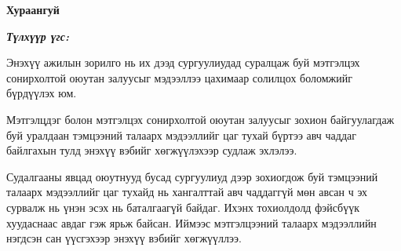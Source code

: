

\begin{center}
{\scshape\Large \univname\par} %
{\scshape\large \facname\par}\vspace{0.5cm} %
{\huge\textbf{{Хураангуй}} \par}
\bigskip
{\Large{\ttitle} \par} %
\bigskip

{\normalsize \shortname \par} %
\addressname
\end{center}

\textit{\textbf{Түлхүүр үгс: \keywordnames}}
\bigskip

Энэхүү ажилын зорилго нь их дээд сургуулиудад суралцаж буй мэтгэлцэх сонирхолтой оюутан залуусыг мэдээллээ цахимаар солилцох боломжийг бүрдүүлэх юм. 

Мэтгэлцдэг болон мэтгэлцэх сонирхолтой оюутан залуусыг зохион байгуулагдаж буй уралдаан тэмцээний талаарх мэдээллийг цаг тухай бүртээ авч чаддаг байлгахын тулд энэхүү вэбийг хөгжүүлэхээр судлаж эхлэлээ.

Судалгааны явцад оюутнууд бусад сургуулиуд дээр зохиогдож буй тэмцээний талаарх мэдээллийг цаг тухайд нь хангалттай авч чаддаггүй мөн авсан ч эх сурвалж нь үнэн эсэх нь баталгаагүй байдаг. Ихэнх тохиолдолд фэйсбүүк хуудаснаас авдаг гэж ярьж байсан. Иймээс мэтгэлцээний талаарх мэдээллийн нэгдсэн сан үүсгэхээр энэхүү вэбийг хөгжүүллээ.




